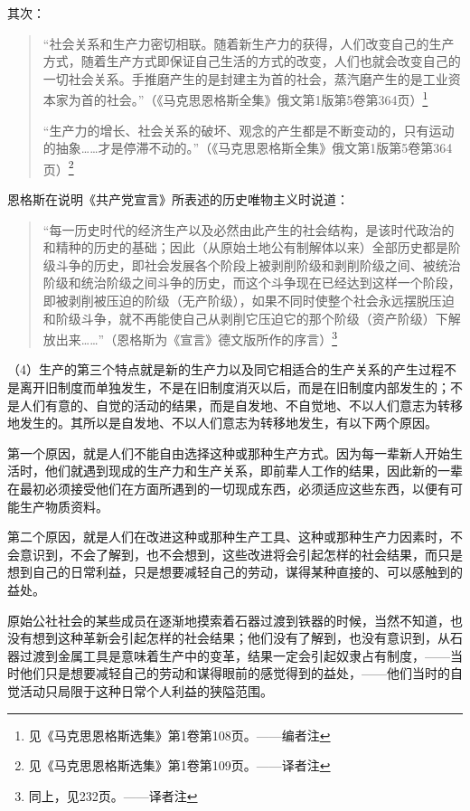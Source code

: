 其次：

\begin{quotation}
“社会关系和生产力密切相联。随着新生产力的获得，人们改变自己的生产方式，随着生产方式即保证自己生活的方式的改变，人们也就会改变自己的一切社会关系。手推磨产生的是封建主为首的社会，蒸汽磨产生的是工业资本家为首的社会。”（《马克思恩格斯全集》俄文第1版第5卷第364页）\footnote{见《马克思恩格斯选集》第1卷第108页。——编者注}

“生产力的增长、社会关系的破坏、观念的产生都是不断变动的，只有运动的抽象……才是停滞不动的。”（《马克思恩格斯全集》俄文第1版第5卷第364页）\footnote{见《马克思恩格斯选集》第1卷第109页。——译者注}
\end{quotation}

恩格斯在说明《共产党宣言》所表述的历史唯物主义时说道：

\begin{quotation}
“每一历史时代的经济生产以及必然由此产生的社会结构，是该时代政治的和精种的历史的基础；因此（从原始土地公有制解体以来）全部历史都是阶级斗争的历史，即社会发展各个阶段上被剥削阶级和剥削阶级之间、被统治阶级和统治阶级之间斗争的历史，而这个斗争现在已经达到这样一个阶段，即被剥削被压迫的阶级（无产阶级），如果不同时使整个社会永远摆脱压迫和阶级斗争，就不再能使自己从剥削它压迫它的那个阶级（资产阶级）下解放出来……”（恩格斯为《宣言》德文版所作的序言）\footnote{同上，见232页。——译者注}
\end{quotation}

（4）生产的第三个特点就是新的生产力以及同它相适合的生产关系的产生过程不是离开旧制度而单独发生，不是在旧制度消灭以后，而是在旧制度内部发生的；不是人们有意的、自觉的活动的结果，而是自发地、不自觉地、不以人们意志为转移地发生的。其所以是自发地、不以人们意志为转移地发生，有以下两个原因。

第一个原因，就是人们不能自由选择这种或那种生产方式。因为每一辈新人开始生活时，他们就遇到现成的生产力和生产关系，即前辈人工作的结果，因此新的一辈在最初必须接受他们在方面所遇到的一切现成东西，必须适应这些东西，以便有可能生产物质资料。

第二个原因，就是人们在改进这种或那种生产工具、这种或那种生产力因素时，不会意识到，不会了解到，也不会想到，这些改进将会引起怎样的社会结果，而只是想到自己的日常利益，只是想要减轻自己的劳动，谋得某种直接的、可以感触到的益处。

原始公社社会的某些成员在逐渐地摸索着石器过渡到铁器的时候，当然不知道，也没有想到这种革新会引起怎样的社会结果；他们没有了解到，也没有意识到，从石器过渡到金属工具是意味着生产中的变革，结果一定会引起奴隶占有制度，——当时他们只是想要减轻自己的劳动和谋得眼前的感觉得到的益处，——他们当时的自觉活动只局限于这种日常个人利益的狭隘范围。

